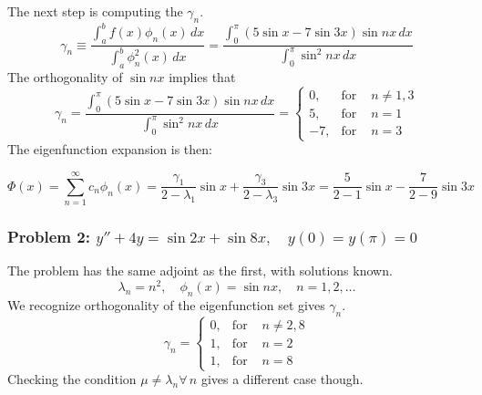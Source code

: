 The next step is computing the $\gamma_n$.
\begin{equation*}
    \gamma_n \equiv \frac{\int_{a}^b f(x)\phi_n(x)\,dx}{\int_{a}^b \phi_n^2(x)\,dx} = \frac{\int_{0}^\pi (5\sin x -7\sin 3x)\sin nx \,dx}{\int_{0}^\pi \sin^2 nx\,dx}
\end{equation*}
The orthogonality of $\sin nx$ implies that
\begin{equation*}
    \gamma_n = \frac{\int_{0}^\pi (5\sin x -7\sin 3x)\sin nx \,dx}{\int_{0}^\pi \sin^2nx\,dx} = \left\{\begin{array}{rrl}
        0, &  \text{for } & n \neq 1,3 \\
        5, &  \text{for } & n = 1 \\
        -7, &  \text{for } & n = 3
        \end{array}\right. 
\end{equation*}
The eigenfunction expansion is then:

\begin{equation*}
    \Phi(x) = \sum_{n=1}^\infty c_n \phi_n(x) = \frac{\gamma_1}{2-\lambda_1}\sin x + \frac{\gamma_3}{2-\lambda_3}\sin 3x =  \frac{5}{2-1}\sin x - \frac{7}{2-9}\sin 3x
\end{equation*}


\subsubsection{Problem 2: $y''+4y=\sin 2x +\sin 8x,\quad y(0)=y(\pi)=0$}
The problem has the same adjoint as the first, with solutions known.
\begin{equation*}
    \lambda_n=n^2, \quad \phi_n(x) = \sin nx, \quad n=1,2,\dots
\end{equation*}
We recognize orthogonality of the eigenfunction set gives $\gamma_n$.
\begin{equation*}
    \gamma_n = \left\{\begin{array}{rrl}
        0, &  \text{for } & n \neq 2,8 \\
        1, &  \text{for } & n = 2 \\
        1, &  \text{for } & n = 8
        \end{array}\right. 
\end{equation*}
Checking the condition $\mu\neq\lambda_n \forall \,n$ gives a different case though.



